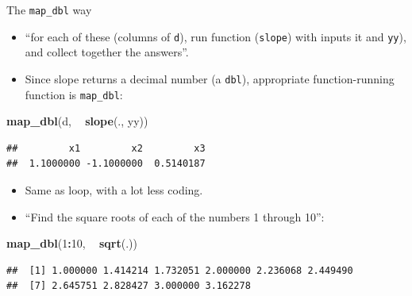\documentclass[ignorenonframetext,]{beamer}
\newenvironment{Shaded}{\begin{snugshade}}{\end{snugshade}}
\newcommand{\DecValTok}[1]{\textcolor[rgb]{0.00,0.00,0.81}{#1}}
\newcommand{\KeywordTok}[1]{\textcolor[rgb]{0.13,0.29,0.53}{\textbf{#1}}}
\newcommand{\NormalTok}[1]{#1}
\newcommand{\OperatorTok}[1]{\textcolor[rgb]{0.81,0.36,0.00}{\textbf{#1}}}
\newcommand{\StringTok}[1]{\textcolor[rgb]{0.31,0.60,0.02}{#1}}
\providecommand{\tightlist}{%
  \setlength{\itemsep}{0pt}\setlength{\parskip}{0pt}}
\begin{document}
\begin{frame}[fragile]{The \texttt{map\_dbl} way}
\protect\hypertarget{the-map_dbl-way}{}

\begin{itemize}
\tightlist
\item
  ``for each of these (columns of \texttt{d}), run function
  (\texttt{slope}) with inputs it and \texttt{yy}), and collect together
  the answers''.
\item
  Since slope returns a decimal number (a \texttt{dbl}), appropriate
  function-running function is \texttt{map\_dbl}:
\end{itemize}

\begin{Shaded}
\begin{Highlighting}[]
\KeywordTok{map_dbl}\NormalTok{(d, }\OperatorTok{~}\StringTok{ }\KeywordTok{slope}\NormalTok{(., yy))}
\end{Highlighting}
\end{Shaded}

\begin{verbatim}
##         x1         x2         x3 
##  1.1000000 -1.1000000  0.5140187
\end{verbatim}

\begin{itemize}
\tightlist
\item
  Same as loop, with a lot less coding.
\item
  ``Find the square roots of each of the numbers 1 through 10'':
\end{itemize}

\begin{Shaded}
\begin{Highlighting}[]
\KeywordTok{map_dbl}\NormalTok{(}\DecValTok{1}\OperatorTok{:}\DecValTok{10}\NormalTok{, }\OperatorTok{~}\StringTok{ }\KeywordTok{sqrt}\NormalTok{(.))}
\end{Highlighting}
\end{Shaded}

\begin{verbatim}
##  [1] 1.000000 1.414214 1.732051 2.000000 2.236068 2.449490
##  [7] 2.645751 2.828427 3.000000 3.162278
\end{verbatim}

\end{frame}
\end{document}
